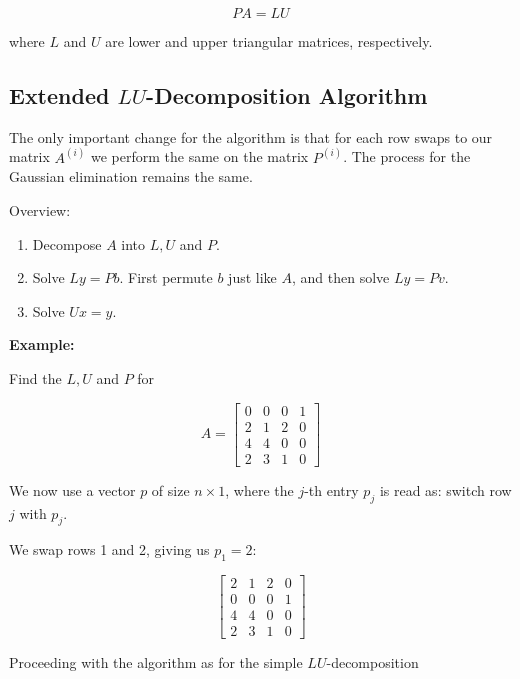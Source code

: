 \[
    PA = LU
\]

where \(L\) and \(U\) are lower and upper triangular matrices, respectively.

\subsection{Extended \(LU\)-Decomposition Algorithm}

The only important change for the algorithm is that for each row swaps to our matrix \(A^{(i)}\) we perform the same on the matrix 
\(P^{(i)}\). The process for the Gaussian elimination remains the same.

Overview:

\begin{enumerate}

    \item Decompose \(A\) into  \(L,U\) and \(P\).

    \item Solve \(Ly = Pb\). First permute \(b\) just like \(A\), and then solve \(Ly = Pv\).
    
    \item Solve \(Ux = y\). 

\end{enumerate}

\textbf{Example:}

Find the \(L,U\) and \(P\) for

\[
    A = 
    \begin{bmatrix}
        0 & 0 & 0 & 1 \\ 
        2 & 1 & 2 & 0 \\ 
        4 & 4 & 0 & 0 \\ 
        2 & 3 & 1 & 0
    \end{bmatrix}
\]

We now use a vector \(p\) of size \(n \times 1\), where the \(j\)-th entry \(p_j\) is read as: switch row \(j\) with \(p_j\).

We swap rows 1 and 2, giving us \(p_1 = 2\):

\[
    \begin{bmatrix} 
        2 & 1 & 2 & 0 \\ 
        0 & 0 & 0 & 1 \\ 
        4 & 4 & 0 & 0 \\ 
        2 & 3 & 1 & 0
    \end{bmatrix}
\]

Proceeding with the algorithm as for the simple \(LU\)-decomposition 

